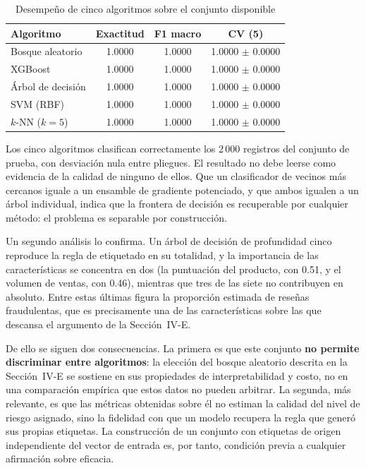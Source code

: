 \begin{table}[t]
\caption{Desempeño de cinco algoritmos sobre el conjunto disponible}
\label{tab:bench}
\centering
\footnotesize
\renewcommand{\arraystretch}{1.12}
\begin{tabular}{@{}p{2.55cm}ccc@{}}
\toprule
\textbf{Algoritmo} & \textbf{Exactitud} & \textbf{F1 macro} & \textbf{CV (5)} \\
\midrule
Bosque aleatorio     & 1.0000 & 1.0000 & 1.0000 $\pm$ 0.0000 \\
XGBoost              & 1.0000 & 1.0000 & 1.0000 $\pm$ 0.0000 \\
Árbol de decisión    & 1.0000 & 1.0000 & 1.0000 $\pm$ 0.0000 \\
SVM (RBF)            & 1.0000 & 1.0000 & 1.0000 $\pm$ 0.0000 \\
$k$-NN ($k=5$)       & 1.0000 & 1.0000 & 1.0000 $\pm$ 0.0000 \\
\bottomrule
\end{tabular}
\end{table}

Los cinco algoritmos clasifican correctamente los 2\,000 registros del conjunto de prueba, con
desviación nula entre pliegues. El resultado no debe leerse como evidencia de la calidad de
ninguno de ellos. Que un clasificador de vecinos más cercanos iguale a un ensamble de
gradiente potenciado, y que ambos igualen a un árbol individual, indica que la frontera de
decisión es recuperable por cualquier método: el problema es separable por construcción.

Un segundo análisis lo confirma. Un árbol de decisión de profundidad cinco reproduce la regla
de etiquetado en su totalidad, y la importancia de las características se concentra en dos (la
puntuación del producto, con 0.51, y el volumen de ventas, con 0.46), mientras que tres de las
siete no contribuyen en absoluto. Entre estas últimas figura la proporción estimada de reseñas
fraudulentas, que es precisamente una de las características sobre las que descansa el
argumento de la Sección~IV-E.

De ello se siguen dos consecuencias. La primera es que este conjunto \textbf{no permite
discriminar entre algoritmos}: la elección del bosque aleatorio descrita en la Sección~IV-E se sostiene
en sus propiedades de interpretabilidad y costo, no en una comparación empírica que estos
datos no pueden arbitrar. La segunda, más relevante, es que las métricas obtenidas sobre él no
estiman la calidad del nivel de riesgo asignado, sino la fidelidad con que un modelo recupera
la regla que generó sus propias etiquetas. La construcción de un conjunto con
etiquetas de origen independiente del vector de entrada es, por tanto, condición previa a
cualquier afirmación sobre eficacia.


